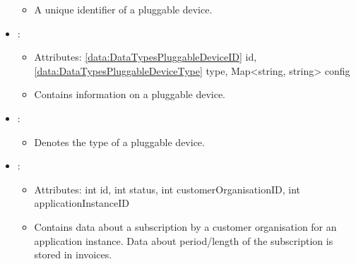 \begin{itemize}[nolistsep,noitemsep]
\begin{itemize}[noitemsep,nolistsep]
\item[] A unique identifier of a pluggable device.
\end{itemize}
\item {}: 
\begin{itemize}[noitemsep,nolistsep]
\item[] Attributes: \ref{data:DataTypesPluggableDeviceID} id, \ref{data:DataTypesPluggableDeviceType} type, Map\textless{}string, string\textgreater{} config
\item[] Contains information on a pluggable device.
\end{itemize}
\item {}: 
\begin{itemize}[noitemsep,nolistsep]

\item[] Denotes the type of a pluggable device.
\end{itemize}
\item {}: 
\begin{itemize}[noitemsep,nolistsep]
\item[] Attributes: int id, int status, int customerOrganisationID, int applicationInstanceID
\item[] Contains data about a subscription by a customer organisation for an application instance. Data about period/length of the subscription is stored in invoices.
\end{itemize}
\end{itemize}

%